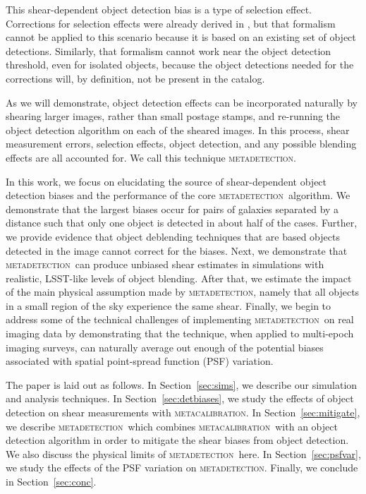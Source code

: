 \documentclass[fleqn,useAMS,usenatbib]{mnras}
\newcommand{\mcal}{\textsc{metacalibration}}
\newcommand{\mdet}{\textsc{metadetection}}
\begin{document}
This shear-dependent object detection bias is a type of selection effect.
Corrections for selection effects were already derived in
\cite{SheldonMcal2017},  but that formalism cannot be applied to this scenario
because it is based on an existing set of object detections.  Similarly, that
formalism cannot work near the object detection threshold, even for isolated
objects, because the object detections needed for the corrections will, by definition,
not be present in the catalog.

As we will demonstrate, object detection effects can be incorporated naturally
by shearing larger images, rather than small postage stamps, and re-running the
object detection algorithm on each of the sheared images. In this process,
shear measurement errors, selection effects, object detection, and any possible
blending effects are all accounted for.  We call this technique \mdet.

In this work, we focus on elucidating the source of shear-dependent object
detection biases and the performance of the core \mdet\ algorithm. We
demonstrate that the largest biases occur for pairs of galaxies separated by a
distance such that only one object is detected in about half of the cases.
Further, we provide evidence that object deblending techniques that are based
objects detected in the image cannot correct for the biases. Next, we
demonstrate that \mdet\ can produce unbiased shear estimates in simulations
with realistic, LSST-like \citep[e.g.,][]{chang2013} levels of object blending.
After that, we estimate the impact of the main physical assumption made by
\mdet, namely that all objects in a small region of the sky experience the same
shear. Finally, we begin to address some of the technical challenges of
implementing \mdet\ on real imaging data by demonstrating that the technique,
when applied to multi-epoch imaging surveys, can naturally average out enough
of the potential biases associated with spatial point-spread function (PSF)
variation.

The paper is laid out as follows. In Section~\ref{sec:sims}, we describe our
simulation and analysis techniques. In Section~\ref{sec:detbiases}, we study
the effects of object detection on shear measurements with \mcal.
In Section~\ref{sec:mitigate}, we describe \mdet\ which combines \mcal\ with
an object detection algorithm in order to mitigate the shear biases from object
detection. We also discuss the physical limits of \mdet\ here.
In Section~\ref{sec:psfvar}, we study the effects of the PSF variation on \mdet.
Finally, we conclude in Section~\ref{sec:conc}.
\end{document}
